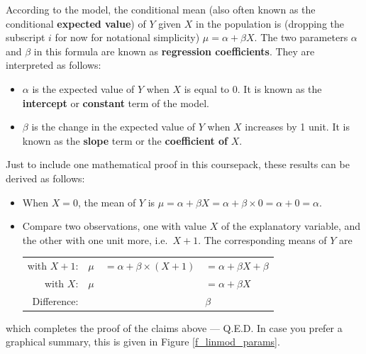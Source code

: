 According to the model, the conditional mean (also often known as the
conditional \textbf{expected value})
of $Y$ given $X$ in the
population is (dropping the subscript $i$ for now for notational
simplicity) $\mu=\alpha+\beta X$. The two parameters $\alpha$ and
$\beta$ in this formula are known as \textbf{regression coefficients}.
They are interpreted as follows:
\begin{itemize}
\item
$\alpha$ is the expected value of $Y$ when $X$ is equal to 0. It is
known as the \textbf{intercept} or \textbf{constant} term of the model.
\item
$\beta$ is the change in the expected value of $Y$ when $X$ increases by
1 unit. It is known as the \textbf{slope} term or the
\textbf{coefficient of} $X$.
\end{itemize}
Just to include one mathematical proof in this coursepack,
these results can be derived as follows:
\begin{itemize}
\item
When $X=0$, the mean of $Y$ is $\mu=\alpha+\beta X=\alpha+\beta\times 0
=\alpha+0=\alpha$.
\item
Compare two observations, one with value $X$ of the explanatory
variable, and the other with one unit more, i.e.\ $X+1$. The
corresponding means of $Y$ are

\vspace*{.5ex}
\begin{tabular}{rlll}
with $X+1$: & $\mu$ &
$=\alpha+\beta\times (X+1)$ &
$=\alpha+\beta X +\beta$ \\
with $X$\hspace*{1.7em}: & $\mu$ &
& $=\alpha+\beta X$ \\ \hline
Difference\hspace*{3ex}: & & & \hspace*{5.5em}$\beta$
\end{tabular}
\end{itemize}
which completes the proof of the claims above --- Q.E.D. In case you
prefer a graphical summary, this is given in Figure \ref{f_linmod_params}.

